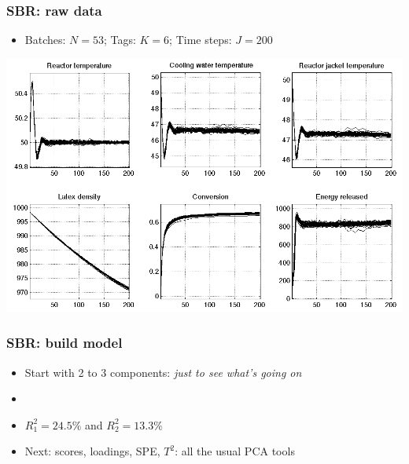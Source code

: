 \begin{frame}\frametitle{SBR: raw data}
	
	\begin{itemize}
		\item	Batches: \( N = 53 \); Tags: \( K = 6 \); Time steps: \( J = 200 \)
		
	\end{itemize}
	
	\begin{center}
		\includegraphics[width=\textwidth]{images/sbr/SBR-raw-data-trajectories.png}
	\end{center}
	{}
\end{frame}

\begin{frame}\frametitle{SBR: build model}
	
	\begin{itemize}
		\item	Start with 2 to 3 components: \emph{just to see what's going on}
		
		\item	{}
		
		\item	\( R^2_1 = 24.5\% \) and \( R^2_2 = 13.3\% \)
		
		\item	Next: scores, loadings, SPE, \( T^2 \): all the usual PCA tools
		
	\end{itemize}

\end{frame}

